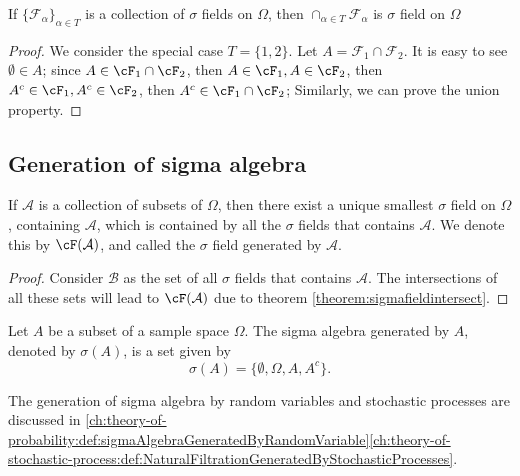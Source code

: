 \begin{refsection}
\begin{lemma} \label{theorem:sigmafieldintersect}\cite{dineen2013probability} 
If $\{\mathcal{F}_{\alpha}\}_{\alpha \in T}$ is a collection of $\sigma$ fields on $\Omega$, then $\cap_{\alpha \in T} \mathcal{F}_{\alpha}$ is $\sigma$ field on $\Omega$
\end{lemma}
\begin{proof}
We consider the special case $T=\{1,2\}$. Let $A = \mathcal{F}_1 \cap \mathcal{F}_2$. It is easy to see $\emptyset \in A$; since $A \in \cF_1 \cap \cF_2$, then $A \in \cF_1,A\in \cF_2$, then $A^c \in \cF_1, A^c \in \cF_2$, then $A^c\in \cF_1\cap \cF_2$; Similarly, we can prove the union property.
\end{proof}


\subsection{Generation of sigma algebra}

\begin{lemma}\label{ch:theory-of-probability:th:sigmafieldGeneration}
 If $\mathcal{A}$ is a collection of subsets of $\Omega$, then there exist a unique smallest $\sigma$ field on $\Omega$, containing $\mathcal{A}$, which is contained by all the $\sigma$ fields that contains $\mathcal{A}$. We denote this by $\cF(\mathcal{A})$, and called the $\sigma$ field generated by $\mathcal{A}$.\cite{dineen2013probability}
\end{lemma}
\begin{proof}
Consider $\mathcal{B}$ as the set of all $\sigma$ fields that contains $\mathcal{A}$. The intersections of all these sets will lead to $\cF(\mathcal{A})$ due to theorem \ref{theorem:sigmafieldintersect}.
\end{proof}

\begin{definition}
	Let $A$ be a subset of a sample space $\Omega$. The sigma algebra generated by $A$, denoted by $\sigma(A)$, is a set given by
	$$\sigma(A) = \{\emptyset, \Omega, A, A^c\}.$$	
\end{definition}

\begin{remark}
The generation of sigma algebra by random variables and stochastic processes are discussed in \autoref{ch:theory-of-probability:def:sigmaAlgebraGeneratedByRandomVariable}\autoref{ch:theory-of-stochastic-process:def:NaturalFiltrationGeneratedByStochasticProcesses}.	
\end{remark}




\end{refsection}
